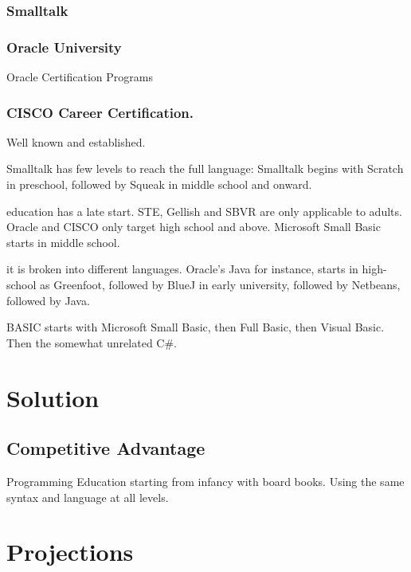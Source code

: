 \documentclass{article}
\begin{document}
\subsubsection{Smalltalk}
\subsubsection{Oracle University}
Oracle Certification Programs
\subsubsection{CISCO Career Certification.}
Well known and established.

Smalltalk has few levels to reach the full language:
Smalltalk begins with Scratch in preschool, 
followed by Squeak in middle school and onward.

education has a late start.
STE, Gellish and SBVR are only applicable to adults.
Oracle and CISCO only target high school and above.
Microsoft Small Basic starts in middle school.

it is broken into different languages.
Oracle's Java for instance,
starts in high-school as Greenfoot,
followed by BlueJ in early university, 
followed by Netbeans, followed by Java.

BASIC starts with
Microsoft Small Basic, then Full Basic, then Visual Basic.
Then the somewhat unrelated C#.




\section{Solution}
\subsection{Competitive Advantage}
Programming Education starting from infancy with board books.
Using the same syntax and language at all levels.




\section{Projections}
\end{document}
